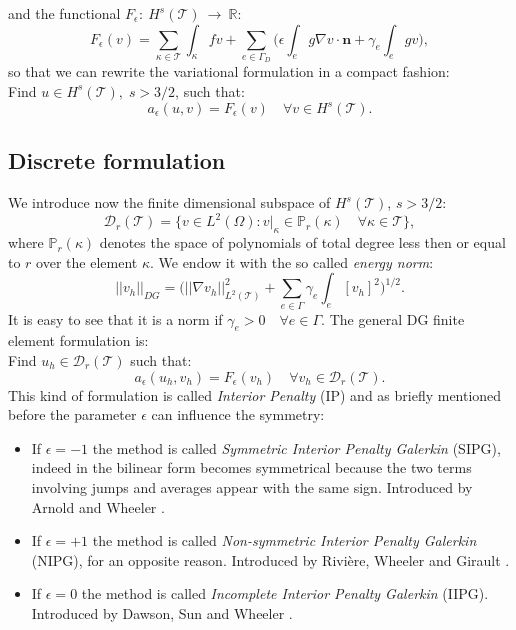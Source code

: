 \documentclass[12pt, a4paper]{article}
\theoremstyle{definition}
\theoremstyle{plain}
\theoremstyle{plain}
\theoremstyle{definition}
\begin{document}
and the functional $F_\epsilon:~H^s(\mathcal{T})~\rightarrow~\mathbb{R}$:
\begin{equation*}
	F_\epsilon(v) = \sum_{\kappa \in \mathcal{T}} \int_\kappa fv
	+ \sum_{e \in \Gamma_D} \bigg( \epsilon \int_e g \nabla v \cdot \mathbf{n}
	+ \gamma_e \int_e gv \bigg),
\end{equation*}
so that we can rewrite the variational formulation in a compact fashion:\\
Find $u \in H^s(\mathcal{T}), \; s>3/2$, such that:
\begin{equation} \label{eq:dgvarform}
	a_\epsilon(u, v) = F_\epsilon(v) \quad \forall v \in H^s(\mathcal{T}).
\end{equation}
\subsection{Discrete formulation}
We introduce now the finite dimensional subspace of $H^s(\mathcal{T})$, $s>3/2$:
\begin{equation} \label{eq:dgspace}
	\mathcal{D}_r(\mathcal{T}) = \{ v \in L^2(\Omega) : v|_\kappa \in 
	\mathbb{P}_r(\kappa) \quad \forall \kappa \in \mathcal{T}  \},
\end{equation}
where $\mathbb{P}_r(\kappa)$ denotes the space of polynomials of total degree 
less then or equal to $r$ over the element $\kappa$. We endow it with the so 
called \textit{energy norm}:
\begin{equation*}
	|\!|v_h|\!|_{DG} = \bigg( |\!|\nabla v_h|\!|^2_{L^2(\mathcal{T})} + \sum_{e \in \Gamma} \gamma_e \int_e [v_h]^2 \bigg)^{1/2}.
\end{equation*}
It is easy to see that it is a norm if $\gamma_e > 0 \quad \forall e \in 
\Gamma$. The general DG finite element formulation is:\\
Find $u_h \in \mathcal{D}_r(\mathcal{T})$ such that:
\begin{equation} \label{eq:dgfemform}
	a_\epsilon(u_h, v_h) = F_\epsilon(v_h) \quad \forall v_h \in 
	\mathcal{D}_r(\mathcal{T}).
\end{equation}
This kind of formulation is called \textit{Interior Penalty} (IP) and as briefly mentioned before the parameter $\epsilon$ can influence the symmetry:
\begin{itemize}
\item
If $\epsilon = -1$ the method is called \textit{Symmetric Interior Penalty 
Galerkin} (SIPG), indeed in the bilinear form becomes symmetrical because the 
two terms involving jumps and averages appear with the same sign. Introduced by 
Arnold \cite{arn82} and Wheeler \cite{whe78}.
\item
If  $\epsilon = +1$ the method is called \textit{Non-symmetric Interior Penalty 
Galerkin} (NIPG), for an opposite reason. Introduced by Rivière, Wheeler 
and Girault \cite{rwg}.
\item
If $\epsilon = 0$ the method is called \textit{Incomplete Interior Penalty 
Galerkin} (IIPG). Introduced by Dawson, Sun and Wheeler \cite{dsw}.
\end{itemize}
\end{document}
